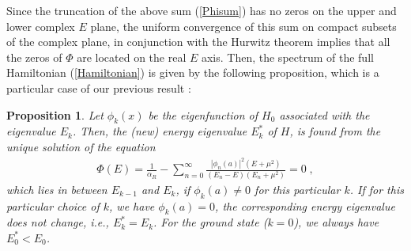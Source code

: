 \documentclass[amsmath,amssymb,14pt]{article}
\numberwithin{equation}{section}
\newtheorem{myproposition}[mytheo]{Proposition}
\begin{document}
Since the truncation of the above sum (\ref{Phisum}) has no zeros on the upper and lower complex $E$ plane, the uniform convergence of this sum on compact subsets of the complex plane, in conjunction with the Hurwitz theorem \cite{Conway}  implies that all the zeros of $\Phi$ are located on the real $E$ axis. Then, the spectrum of the full Hamiltonian (\ref{Hamiltonian}) is given by the following proposition, which is a particular case of our previous result \cite{Annals23}:
%
\begin{myproposition} \label{prop21}Let $\phi_k(x)$ be the  eigenfunction of $H_0$ associated with the eigenvalue  $E_k$.
Then, the  (new) energy eigenvalue $E_{k}^{*}$ of $H$, is found from the unique solution of  the equation
%
\begin{eqnarray}
\Phi(E)=\frac{1}{\alpha_R}- \sum_{n=0}^{\infty} \frac{|\phi_n(a)|^2(E+\mu^2)}{(E_n-E)(E_n+\mu^2)}   = 0 \label{boundstatenergyrenorm}\;,
\end{eqnarray}
%
which lies in between $E_{k-1}$ and $E_k$, if $\phi_k(a) \neq 0$ for this particular $k$. If for this particular choice of $k$, we have $\phi_k(a)=0$, the corresponding energy eigenvalue does  not change, i.e., $E_{k}^{*}=E_k$.  
For the ground state ($k=0$), we always have  $E_{0}^{*} < E_0$.
%
\end{myproposition}
\end{document}
